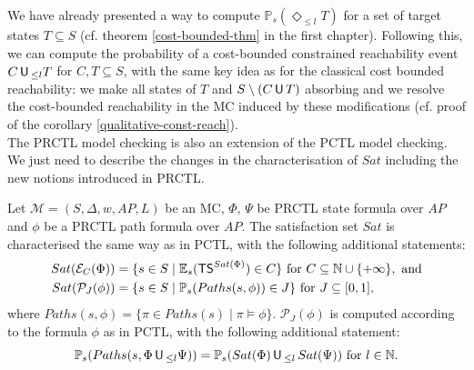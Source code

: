 We have already presented a way to compute $\mathbb{P}_s(\Diamond_{\leq l} T)$ for a set of target states $T \subseteq S$ (cf. theorem \ref{cost-bounded-thm} in the first chapter).
Following this,
we can compute the probability of a cost-bounded constrained reachability event $C \,\text{\sffamily U}\,_{\leq l} T$ for $C, T \subseteq S$, with the same key idea as for the classical cost bounded reachability:
we make all states of $T$ and $S \setminus (C \,\text{\sffamily U}\, T)$ absorbing and we resolve the cost-bounded reachability in the MC induced by these modifications (cf.  proof of the corollary \ref{qualitative-const-reach}).\\

The PRCTL model checking is also an extension of the PCTL model checking. We just need to describe the changes in the
characterisation of $Sat$ including the new notions introduced in PRCTL.
\begin{property}
  Let $\mathcal{M}=(S, \Delta, w, AP, L)$ be an MC, $\Phi$, $\Psi$ be PRCTL state formula over $AP$ and $\phi$ be a PRCTL path formula over $AP$. The satisfaction set $Sat$ is characterised the same way as in PCTL, with the following additional statements:
  \begin{align*}
    Sat(\mathcal{E}_C(\Phi)) &= \{ s \in S \; | \; \mathbb{E}_s(\text{\sffamily TS}^{Sat(\Phi)}) \in C \} \text{ for } C \subseteq \mathbb{N} \cup \{+\infty\}, \text{ and} \\
    Sat(\mathcal{P}_J(\phi)) &= \{ s \in S \; | \; \mathbb{P}_s (Paths(s, \phi)) \in J \} \text{ for } J \subseteq [0, 1],
  \end{align*}
    where $Paths(s, \phi) = \{ \pi \in Paths(s) \; | \; \pi \models \phi \}$.
    $\mathcal{P}_J(\phi)$ is computed according to the formula $\phi$ as in PCTL, with the following additional statement:
  \[
    \mathbb{P}_s(Paths(s, \Phi \,\text{\sffamily U}\,_{\leq l} \Psi)) = \mathbb{P}_s(Sat(\Phi) \,\text{\sffamily U}\,_{\leq l} \, Sat(\Psi)) \text{ for } l \in \mathbb{N}.
  \]
\end{property}

